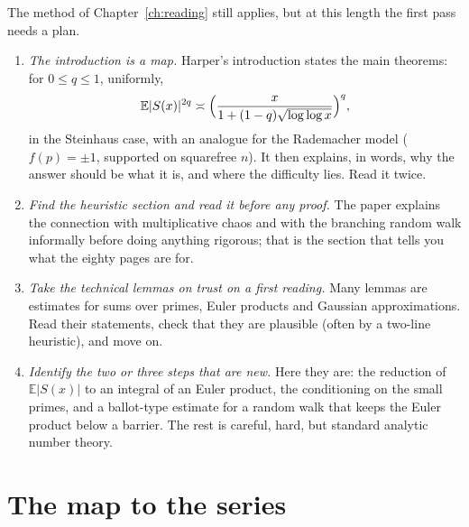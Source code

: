 The method of Chapter~\ref{ch:reading} still applies, but at this length the first pass needs a plan.
\begin{enumerate}
\item \emph{The introduction is a map.} Harper's introduction states the main theorems: for $0\le q\le1$, uniformly,
\[
\mathbb E|S(x)|^{2q}\asymp\Bigl(\frac x{1+(1-q)\sqrt{\log\log x}}\Bigr)^q,
\]
in the Steinhaus case, with an analogue for the Rademacher model ($f(p)=\pm1$, supported on squarefree $n$). It then explains, in words, why the answer should be what it is, and where the difficulty lies. Read it twice.
\item \emph{Find the heuristic section and read it before any proof.} The paper explains the connection with multiplicative chaos and with the branching random walk informally before doing anything rigorous; that is the section that tells you what the eighty pages are for.
\item \emph{Take the technical lemmas on trust on a first reading.} Many lemmas are estimates for sums over primes, Euler products and Gaussian approximations. Read their statements, check that they are plausible (often by a two-line heuristic), and move on.
\item \emph{Identify the two or three steps that are new.} Here they are: the reduction of $\mathbb E|S(x)|$ to an integral of an Euler product, the conditioning on the small primes, and a ballot-type estimate for a random walk that keeps the Euler product below a barrier. The rest is careful, hard, but standard analytic number theory.
\end{enumerate}

\section{The map to the series}


